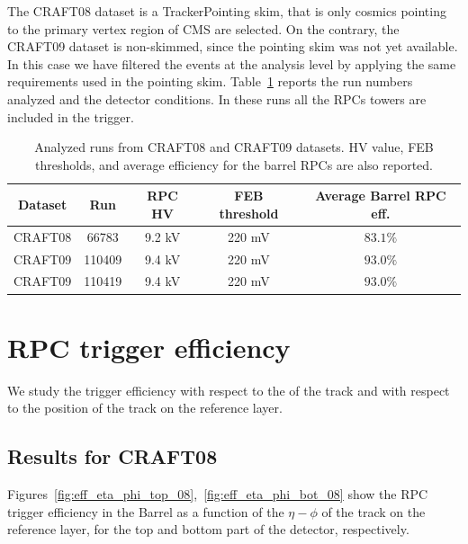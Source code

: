 The CRAFT08 dataset is a TrackerPointing skim, that is 
only cosmics pointing to the primary vertex 
region of CMS are selected. 
On the contrary, the CRAFT09 dataset is non-skimmed, 
since the pointing skim was not yet 
available. In this case we have filtered the 
events at the analysis level by applying the same
requirements used in the pointing skim.
Table~\ref{tab:runs} reports the run numbers analyzed and the detector
conditions. In these runs all the RPCs towers are included in the
 trigger. 

 \begin{table}[htb]
    \begin{center}
      \begin{tabular}{|c|c|c|c|c|} \hline
Dataset & Run   & RPC HV & FEB threshold & Average Barrel RPC eff.\\ \hline
CRAFT08 & 66783 & 9.2 kV & 220 mV & $83.1\%$ \\ \hline
CRAFT09 & 110409  & 9.4 kV & 220 mV & $93.0\%$ \\ \hline
CRAFT09 & 110419  & 9.4 kV & 220 mV & $93.0\%$ \\ \hline
      \end{tabular}
      \caption{Analyzed runs from CRAFT08 
and CRAFT09 datasets. HV value, FEB thresholds, and average
efficiency for the barrel RPCs are also reported.}
    \label{tab:runs}
    \end{center}
  \end{table}

\section{RPC trigger efficiency}
\label{resultSection}


We study the trigger efficiency with respect to the \pt of the track and 
with respect to the position of the track on the reference layer.

\subsection{Results for CRAFT08}
\label{eff_08}

Figures~\ref{fig:eff_eta_phi_top_08},~\ref{fig:eff_eta_phi_bot_08} show 
the RPC trigger efficiency in the Barrel as a function of the 
$\eta - \phi$ of the track on the reference layer, for the top 
and bottom part of the detector, respectively. 

